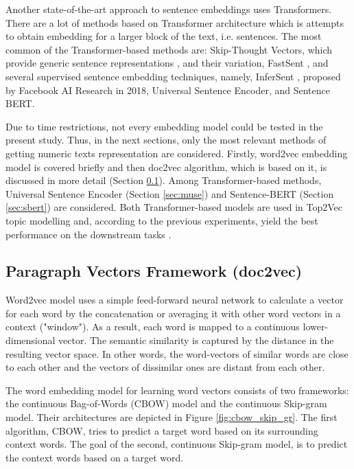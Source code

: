 \documentclass[fontsize=12pt,a4paper,twoside,openany]{scrbook}
\begin{document}
Another state-of-the-art approach to sentence embeddings uses Transformers. There are a lot of methods based on Transformer architecture which is attempts to obtain embedding for a larger block of the text, i.e. sentences. The most common of the Transformer-based methods are: Skip-Thought Vectors, which provide generic sentence representations \parencite{Kiros15}, and their variation, FastSent \parencite{Hill16}, and several supervised sentence embedding techniques, namely, InferSent \parencite{Conneau17}, proposed by Facebook AI Research in 2018, Universal Sentence Encoder, and Sentence BERT.

Due to time restrictions, not every embedding model could be tested in the present study. Thus, in the next sections, only the most relevant methods of getting numeric texts representation are considered. Firstly, word2vec embedding model is covered briefly and then doc2vec algorithm, which is based on it, is discussed in more detail (Section  \ref{sec:doc2vec}). Among Transformer-based methods, Universal Sentence Encoder (Section \ref{sec:muse}) and Sentence-BERT (Section \ref{sec:sbert}) are considered. Both Transformer-based models are used in Top2Vec topic modelling and, according to the previous experiments, yield the best performance on the downstream tasks \parencite{Wang20}.

\subsection{Paragraph Vectors Framework (doc2vec)}
\label{sec:doc2vec}

Word2vec model uses a simple feed-forward neural network to calculate a vector for each word by the concatenation or averaging it with other word vectors in a context ("window"). As a result, each word is mapped to a continuous lower-dimensional vector. The semantic similarity is captured by the distance in the resulting vector space. In other words, the word-vectors of similar words are close to each other and the vectors of dissimilar ones are distant from each other.

The word embedding model for learning word vectors consists of two frameworks: the continuous Bag-of-Words (CBOW) model and the continuous Skip-gram model. Their architectures are depicted in Figure \ref{fig:cbow_skip_gr}. The first algorithm, CBOW, tries to predict a target word based on its surrounding context words. The goal of the second, continuous Skip-gram model, is to predict the context words based on a target word.
\end{document}
